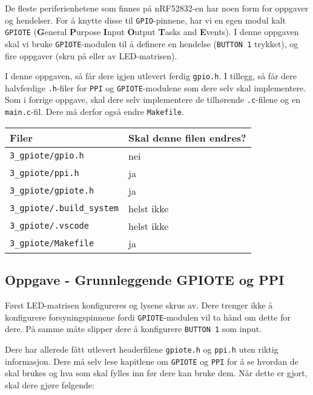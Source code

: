 De fleste periferienhetene som finnes på nRF52832-en har noen form for oppgaver og hendelser. For å knytte disse til \verb|GPIO|-pinnene, har vi en egen modul kalt \verb|GPIOTE| (\textbf{G}eneral \textbf{P}urpose \textbf{I}nput \textbf{O}utput \textbf{T}asks and \textbf{E}vents). I denne oppgaven skal vi bruke \verb|GPIOTE|-modulen til å definere en hendelse (\verb|BUTTON 1| trykket), og fire oppgaver (skru på eller av LED-matrisen).


I denne oppgaven, så får dere igjen utlevert ferdig \verb|gpio.h|. I tillegg, så får dere halvferdige \verb|.h|-filer for \verb|PPI| og \verb|GPIOTE|-modulene som dere selv skal implementere. Som i forrige oppgave, skal dere selv implementere de tilhørende \verb|.c|-filene og en \verb|main.c|-fil. Dere må derfor også endre \verb|Makefile|.

\begin{center}
 \begin{tabular}{|p{8.5cm} p{5.5cm}|} 
 \hline
 Filer & Skal denne filen endres?  \\ [0.5ex] 
 \hline\hline
 \verb|3_gpiote/gpio.h| & \quad \quad \quad \quad nei  \\ 
 \hline
  \verb|3_gpiote/ppi.h| & \quad \quad \quad \quad ja  \\ 
  \hline
  \verb|3_gpiote/gpiote.h| & \quad \quad \quad \quad ja  \\ 
  \hline
  \verb|3_gpiote/.build_system| &  \quad \quad \quad \quad helst ikke \\ 
 \hline
 \verb|3_gpiote/.vscode| &  \quad \quad \quad \quad helst ikke \\ 
 \hline
 \verb|3_gpiote/Makefile| &  \quad \quad \quad \quad ja \\ 
 \hline
\end{tabular}
\end{center}



\subsection{Oppgave - Grunnleggende GPIOTE og PPI}
Først LED-matrisen konfigureres og lysene skrus av. Dere trenger ikke å konfigurere forsyningspinnene fordi \verb|GPIOTE|-modulen vil ta hånd om dette for dere. På samme måte slipper dere å konfigurere \verb|BUTTON 1| som input.

Dere har allerede fått utlevert headerfilene \verb|gpiote.h| og \verb|ppi.h| uten riktig informasjon. Dere må selv lese kapitlene om \verb|GPIOTE| og \verb|PPI| for å se hvordan de skal brukes og hva som skal fylles inn før dere kan bruke dem. Når dette er gjort, skal dere gjøre følgende:

